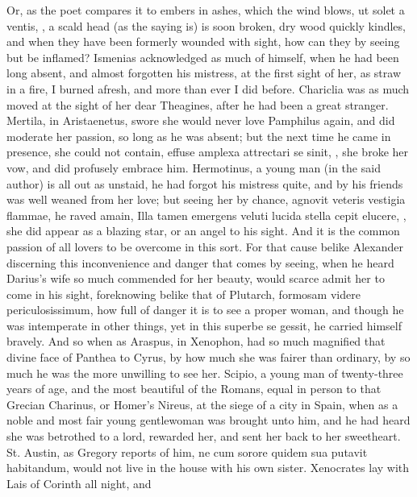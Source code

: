 {Or, as the poet compares it to embers in ashes, which the wind blows,
ut solet a ventis, \etc{}, a scald head (as the saying is) is soon
broken, dry wood quickly kindles, and when they have been formerly
wounded with sight, how can they by seeing but be inflamed? Ismenias
acknowledged as much of himself, when he had been long absent, and
almost forgotten his mistress, at the first sight of her, as
straw in a fire, I burned afresh, and more than ever I did before.
Chariclia was as much moved at the sight of her dear Theagines,
after he had been a great stranger. Mertila, in Aristaenetus,
swore she would never love Pamphilus again, and did moderate her
passion, so long as he was absent; but the next time he came in
presence, she could not contain, effuse amplexa attrectari se sinit,
\etc{}, she broke her vow, and did profusely embrace him. Hermotinus, a
young man (in the said author) is all out as unstaid, he had
forgot his mistress quite, and by his friends was well weaned from her
love; but seeing her by chance, agnovit veteris vestigia flammae, he
raved amain, Illa tamen emergens veluti lucida stella cepit elucere,
\etc{}, she did appear as a blazing star, or an angel to his sight. And it
is the common passion of all lovers to be overcome in this sort. For
that cause belike Alexander discerning this inconvenience and danger
that comes by seeing, when he heard Darius's wife so much
commended for her beauty, would scarce admit her to come in his sight,
foreknowing belike that of Plutarch, formosam videre periculosissimum,
how full of danger it is to see a proper woman, and though he was
intemperate in other things, yet in this superbe se gessit, he carried
himself bravely. And so when as Araspus, in Xenophon, had so much
magnified that divine face of Panthea to Cyrus, by how much she
was fairer than ordinary, by so much he was the more unwilling to see
her. Scipio, a young man of twenty-three years of age, and the most
beautiful of the Romans, equal in person to that Grecian Charinus, or
Homer's Nireus, at the siege of a city in Spain, when as a noble and
most fair young gentlewoman was brought unto him, and he had
heard she was betrothed to a lord, rewarded her, and sent her back to
her sweetheart. St. Austin, as Gregory reports of him, ne cum
sorore quidem sua putavit habitandum, would not live in the house with
his own sister. Xenocrates lay with Lais of Corinth all night, and
}
